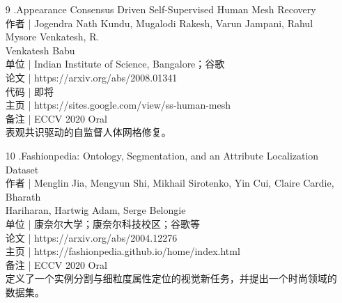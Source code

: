 \documentclass{article}
\begin{document}
\begin{itemize}
	   	\item 
	   	[9].Appearance Consensus Driven Self-Supervised Human Mesh Recovery\\
	   	作者 | Jogendra Nath Kundu, Mugalodi Rakesh, Varun Jampani, Rahul Mysore Venkatesh, R.\\ Venkatesh Babu\\
	   	单位 | Indian Institute of Science, Bangalore；谷歌\\
	   	论文 | https://arxiv.org/abs/2008.01341\\
	   	代码 | 即将\\
	   	主页 | https://sites.google.com/view/ss-human-mesh\\
	   	备注 | ECCV 2020 Oral \\
	   	表观共识驱动的自监督人体网格修复。\\
	   	\item 
	   	[10].Fashionpedia: Ontology, Segmentation, and an Attribute Localization Dataset\\
	   	作者 | Menglin Jia, Mengyun Shi, Mikhail Sirotenko, Yin Cui, Claire Cardie, Bharath\\ Hariharan, Hartwig Adam, Serge Belongie\\
	   	单位 | 康奈尔大学；康奈尔科技校区；谷歌等\\
	   	论文 | https://arxiv.org/abs/2004.12276\\
	   	主页 | https://fashionpedia.github.io/home/index.html\\
	   	备注 | ECCV 2020 Oral \\
	   	定义了一个实例分割与细粒度属性定位的视觉新任务，并提出一个时尚领域的数据集。\\
	   \end{itemize}
	 

	
	
\end{document}
